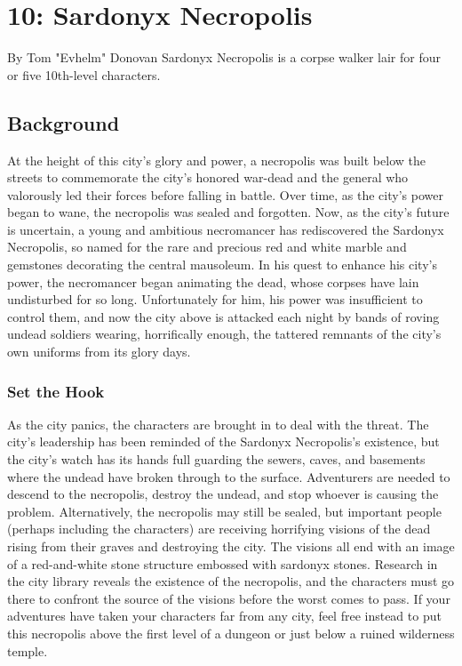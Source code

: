 \documentclass[10pt,a4paper,twoside,twocolumn,openany,bg=print,nodeprecatedcode]{dndbook}
\begin{document}
\chapter{10: Sardonyx Necropolis}
By Tom "Evhelm" Donovan
Sardonyx Necropolis is a corpse walker lair for four or five 10th-level characters.
\section{Background}
At the height of this city's glory and power, a necropolis was built below the streets to commemorate the city's honored war-dead and the general who valorously led their forces before falling in battle. Over time, as the city's power began to wane, the necropolis was sealed and forgotten.
Now, as the city's future is uncertain, a young and ambitious necromancer has rediscovered the Sardonyx Necropolis, so named for the rare and precious red and white marble and gemstones decorating the central mausoleum. In his quest to enhance his city's power, the necromancer began animating the dead, whose corpses have lain undisturbed for so long. Unfortunately for him, his power was insufficient to control them, and now the city above is attacked each night by bands of roving undead soldiers wearing, horrifically enough, the tattered remnants of the city's own uniforms from its glory days.
\subsection{Set the Hook}
As the city panics, the characters are brought in to deal with the threat. The city's leadership has been reminded of the Sardonyx Necropolis's existence, but the city's watch has its hands full guarding the sewers, caves, and basements where the undead have broken through to the surface. Adventurers are needed to descend to the necropolis, destroy the undead, and stop whoever is causing the problem.
Alternatively, the necropolis may still be sealed, but important people (perhaps including the characters) are receiving horrifying visions of the dead rising from their graves and destroying the city. The visions all end with an image of a red-and-white stone structure embossed with sardonyx stones. Research in the city library reveals the existence of the necropolis, and the characters must go there to confront the source of the visions before the worst comes to pass. If your adventures have taken your characters far from any city, feel free instead to put this necropolis above the first level of a dungeon or just below a ruined wilderness temple.
\end{document}
